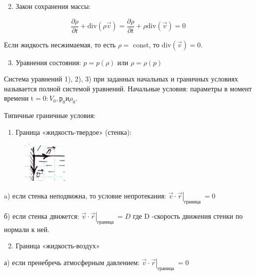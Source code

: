 \begin{enumerate}
  \setcounter{enumi}{1}
  \item Закон сохранения массы:
\end{enumerate}

$$
\frac{\partial \rho}{\partial t}+\mathrm{div}(\rho \vec{v})=\frac{\partial \rho}{\partial t}+\rho \mathrm{div}(\vec{v})=0
$$

Если жидкость несжимаемая, то есть $\rho=$ const, то $\mathrm{div}(\vec{v})=0$.

\begin{enumerate}
  \setcounter{enumi}{2}
  \item Уравнения состояния: $p=p(\rho)$ или $\rho=\rho(p)$
\end{enumerate}

Система уравнений 1), 2), 3) при заданных начальных и граничных условиях называется полной системой уравнений. Начальные условия: параметры в момент времени $\mathrm{t}=0: V_0, р_0 и \rho_{0}$.

Типичные граничные условия:

\begin{enumerate}
  \item Граница «жидкость-твердое» (стенка):
\end{enumerate}


\begin{figure}[h!]
    \centering
    \includegraphics[width=0.2\textwidth]{2023_05_21_6e9b4e8657e82b213c6ag-13}
\end{figure}


a) если стенка неподвижна, то условие непротекания:
$
\left.\vec{v} \cdot \vec{r}\right|_{\text {граница }}=0
$

б) если стенка движется:
$
\left.\vec{v} \cdot \vec{r}\right|_{\text {граница }}=D
$
где D -скорость движения стенки по нормали к ней.

\begin{enumerate}
  \setcounter{enumi}{1}
  \item Граница «жидкость-воздух»
\end{enumerate}

а) если пренебречь атмосферным давлением:
$
\left.\vec{v} \cdot \vec{r}\right|_{\text {граница }}=0
$


